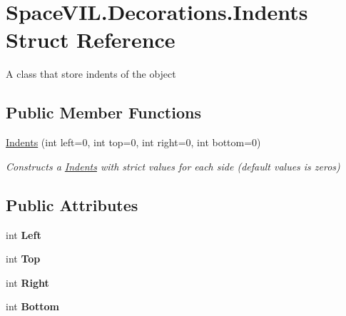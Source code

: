 \hypertarget{struct_space_v_i_l_1_1_decorations_1_1_indents}{}\section{Space\+V\+I\+L.\+Decorations.\+Indents Struct Reference}
\label{struct_space_v_i_l_1_1_decorations_1_1_indents}


A class that store indents of the object  


\subsection*{Public Member Functions}
\begin{DoxyCompactItemize}
\item 
\mbox{\hyperlink{struct_space_v_i_l_1_1_decorations_1_1_indents_ab4ff2d499016f5ac819720f150cb09f1}{Indents}} (int left=0, int top=0, int right=0, int bottom=0)
\begin{DoxyCompactList}\small\item\em Constructs a \mbox{\hyperlink{struct_space_v_i_l_1_1_decorations_1_1_indents}{Indents}} with strict values for each side (default values is zeros) \end{DoxyCompactList}\end{DoxyCompactItemize}
\subsection*{Public Attributes}
\begin{DoxyCompactItemize}
\item 
\mbox{\label{struct_space_v_i_l_1_1_decorations_1_1_indents_a0b3603cd6089cf8b26c5b713b1bb414e}} 
int {\bfseries Left}
\item 
\mbox{\label{struct_space_v_i_l_1_1_decorations_1_1_indents_a021bb29bb023d07c5928404d4fc7dd98}} 
int {\bfseries Top}
\item 
\mbox{\label{struct_space_v_i_l_1_1_decorations_1_1_indents_af8f1040eea23858fba2d32db226ec00c}} 
int {\bfseries Right}
\item 
\mbox{\label{struct_space_v_i_l_1_1_decorations_1_1_indents_a5a73efe6cc0ced684fd668370b8e8fc0}} 
int {\bfseries Bottom}
\end{DoxyCompactItemize}


